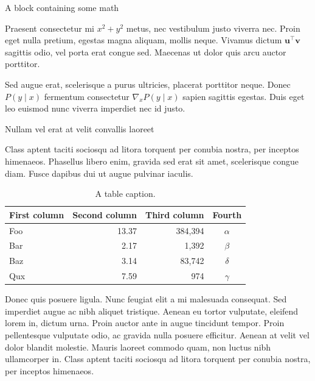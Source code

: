 \documentclass[final]{beamer}
\newlength{\colwidth}
\begin{document}
\begin{frame}[t]
\begin{columns}[t]
\begin{column}{\colwidth}
\begin{block}{A block containing some math}

    Praesent consectetur mi $x^2 + y^2$ metus, nec vestibulum justo viverra
    nec. Proin eget nulla pretium, egestas magna aliquam, mollis neque. Vivamus
    dictum $\mathbf{u}^\intercal\mathbf{v}$ sagittis odio, vel porta erat
    congue sed. Maecenas ut dolor quis arcu auctor porttitor.


    Sed augue erat, scelerisque a purus ultricies, placerat porttitor neque.
    Donec $P(y \mid x)$ fermentum consectetur $\nabla_x P(y \mid x)$ sapien
    sagittis egestas. Duis eget leo euismod nunc viverra imperdiet nec id
    justo.

  \end{block}

  \begin{block}{Nullam vel erat at velit convallis laoreet}

    Class aptent taciti sociosqu ad litora torquent per conubia nostra, per
    inceptos himenaeos. Phasellus libero enim, gravida sed erat sit amet,
    scelerisque congue diam. Fusce dapibus dui ut augue pulvinar iaculis.

    \begin{table}
      \centering
      \begin{tabular}{l r r c}
        \toprule
        \textbf{First column} & \textbf{Second column} & \textbf{Third column} & \textbf{Fourth} \\
        \midrule
        Foo & 13.37 & 384,394 & $\alpha$ \\
        Bar & 2.17 & 1,392 & $\beta$ \\
        Baz & 3.14 & 83,742 & $\delta$ \\
        Qux & 7.59 & 974 & $\gamma$ \\
        \bottomrule
      \end{tabular}
      \caption{A table caption.}
    \end{table}

    Donec quis posuere ligula. Nunc feugiat elit a mi malesuada consequat. Sed
    imperdiet augue ac nibh aliquet tristique. Aenean eu tortor vulputate,
    eleifend lorem in, dictum urna. Proin auctor ante in augue tincidunt
    tempor. Proin pellentesque vulputate odio, ac gravida nulla posuere
    efficitur. Aenean at velit vel dolor blandit molestie. Mauris laoreet
    commodo quam, non luctus nibh ullamcorper in. Class aptent taciti sociosqu
    ad litora torquent per conubia nostra, per inceptos himenaeos.


\end{block}
\end{column}
\end{columns}
\end{frame}
\end{document}
